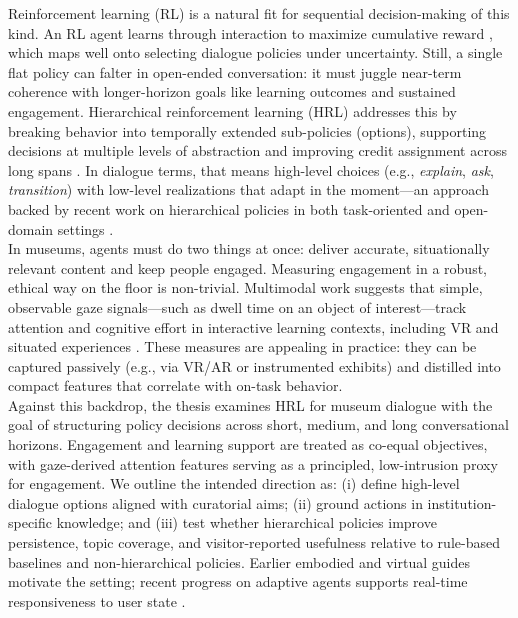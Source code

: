 \documentclass[12pt]{article}
\begin{document}
Reinforcement learning (RL) is a natural fit for sequential decision-making of this kind. An RL agent learns through interaction to maximize cumulative reward \citep{sutton2018reinforcement}, which maps well onto selecting dialogue policies under uncertainty. Still, a single flat policy can falter in open-ended conversation: it must juggle near-term coherence with longer-horizon goals like learning outcomes and sustained engagement. Hierarchical reinforcement learning (HRL) addresses this by breaking behavior into temporally extended sub-policies (options), supporting decisions at multiple levels of abstraction and improving credit assignment across long spans \citep{sutton1999between,dietterich2000maxq}. In dialogue terms, that means high-level choices (e.g., \emph{explain}, \emph{ask}, \emph{transition}) with low-level realizations that adapt in the moment—an approach backed by recent work on hierarchical policies in both task-oriented and open-domain settings \citep{saleh2020hierarchical,wang2021hdno}.\\

In museums, agents must do two things at once: deliver accurate, situationally relevant content and keep people engaged. Measuring engagement in a robust, ethical way on the floor is non-trivial. Multimodal work suggests that simple, observable gaze signals—such as dwell time on an object of interest—track attention and cognitive effort in interactive learning contexts, including VR and situated experiences \citep{adhanom2023vrreview,moreno2024vrsurvey}. These measures are appealing in practice: they can be captured passively (e.g., via VR/AR or instrumented exhibits) and distilled into compact features that correlate with on-task behavior.\\

Against this backdrop, the thesis examines HRL for museum dialogue with the goal of structuring policy decisions across short, medium, and long conversational horizons. Engagement and learning support are treated as co-equal objectives, with gaze-derived attention features serving as a principled, low-intrusion proxy for engagement. We outline the intended direction as: (i) define high-level dialogue options aligned with curatorial aims; (ii) ground actions in institution-specific knowledge; and (iii) test whether hierarchical policies improve persistence, topic coverage, and visitor-reported usefulness relative to rule-based baselines and non-hierarchical policies. Earlier embodied and virtual guides \citep{kopp2005conversational,traum2012ada} motivate the setting; recent progress on adaptive agents supports real-time responsiveness to user state \citep{woo2024adaptive}.\\
\end{document}
